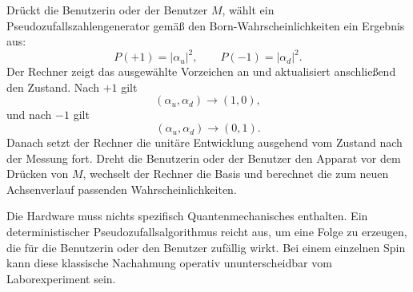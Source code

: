 Drückt die Benutzerin oder der Benutzer \(M\), wählt ein Pseudozufallszahlengenerator gemäß den Born-Wahrscheinlichkeiten ein Ergebnis aus:
\begin{equation}
P(+1)=|\alpha_u|^2,
\qquad
P(-1)=|\alpha_d|^2.
\label{eq:l8-one-spin-born}
\end{equation}
Der Rechner zeigt das ausgewählte Vorzeichen an und aktualisiert anschließend den Zustand. Nach \(+1\) gilt
\begin{equation}
(\alpha_u,\alpha_d)\longrightarrow(1,0),
\end{equation}
und nach \(-1\) gilt
\begin{equation}
(\alpha_u,\alpha_d)\longrightarrow(0,1).
\end{equation}
Danach setzt der Rechner die unitäre Entwicklung ausgehend vom Zustand nach der Messung fort. Dreht die Benutzerin oder der Benutzer den Apparat vor dem Drücken von \(M\), wechselt der Rechner die Basis und berechnet die zum neuen Achsenverlauf passenden Wahrscheinlichkeiten.

Die Hardware muss nichts spezifisch Quantenmechanisches enthalten. Ein deterministischer Pseudozufallsalgorithmus reicht aus, um eine Folge zu erzeugen, die für die Benutzerin oder den Benutzer zufällig wirkt. Bei einem einzelnen Spin kann diese klassische Nachahmung operativ ununterscheidbar vom Laborexperiment sein.

\begin{classroomqa}
\end{classroomqa}

\begin{classroomqa}
\end{classroomqa}

